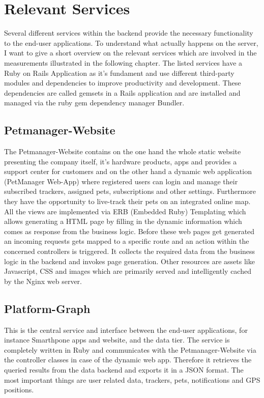 \section{Relevant Services}
Several different services within the backend provide the necessary functionality to the end-user applications. To understand what actually happens on the server, I want to give a short overview on the relevant services which are involved in the measurements illustrated in the following chapter. The listed services have a Ruby on Rails Application as it's fundament and use different third-party modules and dependencies to improve productivity and development. These dependencies are called gemsets in a Rails application and are installed and managed via the ruby gem dependency manager Bundler. 

\subsection{Petmanager-Website}
The Petmanager-Website contains on the one hand the whole static website presenting the company itself, it's hardware products, apps and provides a support center for customers and on the other hand a dynamic web application (PetManager Web-App) where registered users can login and manage their subscribed trackers, assigned pets, subscriptions and other settings. Furthermore they have the opportunity to live-track their pets on an integrated online map. All the views are implemented via ERB (Embedded Ruby) Templating which allows generating a HTML page by filling in the dynamic information which comes as response from the business logic. Before these web pages get generated an incoming requests gets mapped to a specific route and an action within the concerned controllers is triggered. It collects the required data from the business logic in the backend and invokes page generation. Other resources are assets like Javascript, CSS and images which are primarily served and intelligently cached by the Nginx web server. 

\subsection{Platform-Graph}
This is the central service and interface between the end-user applications, for instance Smarthpone apps and website, and the data tier. The service is completely written in Ruby and communicates with the Petmanager-Website via the controller classes in case of the dynamic web app. Therefore it retrieves the queried results from the data backend and exports it in a JSON format. The most important things are user related data, trackers, pets, notifications and GPS positions. 


